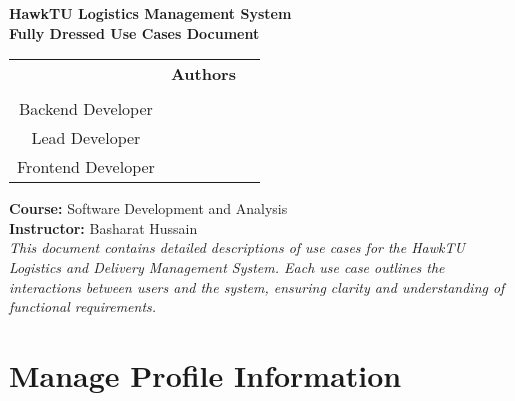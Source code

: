 \documentclass{article}
\begin{document}
\begin{titlepage}
    \centering
    {\Large \textbf{HawkTU Logistics Management System}} \\[8cm]
    
    
    {\huge \textbf{Fully Dressed Use Cases Document}} \\[6cm]

    \begin{tabular}{c c c}
    & {\Large \textbf{Authors}} & \\[0.5cm]
    \begin{minipage}{0.3\textwidth}
        \centering
        {\large Danish Haroon} \\[0.5cm]
        {\large Backend Developer}
    \end{minipage} &
    \begin{minipage}{0.3\textwidth}
        \centering
        {\large Arqam} \\[0.5cm]
        {\large Lead Developer}
    \end{minipage} &
    \begin{minipage}{0.3\textwidth}
        \centering
        {\large Tabish Noman} \\[0.5cm]
        {\large Frontend Developer}
    \end{minipage} \\
    \end{tabular}

    \vspace*{90px}

    {\large \textbf{Course:} Software Development and Analysis} \\[0.5cm]
    {\large \textbf{Instructor:} Basharat Hussain} \\[0.5cm]

    \vfill
    {\large \textit{This document contains detailed descriptions of use cases for the HawkTU Logistics and Delivery Management System. Each use case outlines the interactions between users and the system, ensuring clarity and understanding of functional requirements.}}
\end{titlepage}

\newpage

\centering\section*{Manage Profile Information}

\renewcommand{\arraystretch}{1.5} %
\renewcommand\labelitemi{$\vcenter{\hbox{\tiny$\bullet$}}$}
\end{document}
